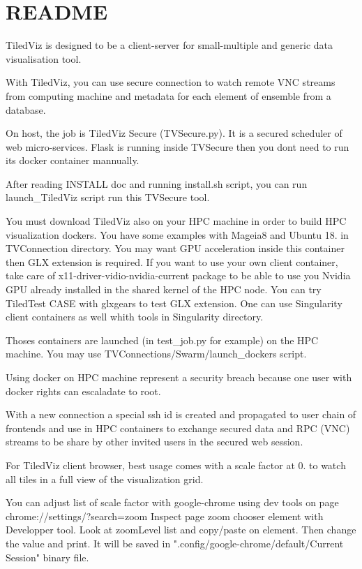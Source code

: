 \chapter{README }
\hypertarget{md_README}{}\label{md_README}
Tiled\+Viz is designed to be a client-\/server for small-\/multiple and generic data visualisation tool.

With Tiled\+Viz, you can use secure connection to watch remote VNC streams from computing machine and metadata for each element of ensemble from a database.

On host, the job is Tiled\+Viz Secure (TVSecure.\+py). It is a secured scheduler of web micro-\/services. Flask is running inside TVSecure then you don\textquotesingle{}t need to run its docker container mannually.

After reading INSTALL doc and running install.\+sh script, you can run launch\+\_\+\+Tiled\+Viz script run this TVSecure tool.

You must download Tiled\+Viz also on your HPC machine in order to build HPC visualization dockers. You have some examples with Mageia8 and Ubuntu 18. in TVConnection directory. You may want GPU acceleration inside this container then GLX extension is required. If you want to use your own client container, take care of x11-\/driver-\/vidio-\/nvidia-\/current package to be able to use you Nvidia GPU already installed in the shared kernel of the HPC node. You can try Tiled\+Test CASE with glxgears to test GLX extension. One can use Singularity client containers as well whith tools in Singularity directory.

Thoses containers are launched (in test\+\_\+job.\+py for example) on the HPC machine. You may use TVConnections/\+\+Swarm/\+launch\+\_\+dockers script.

Using docker on HPC machine represent a security breach because one user with docker rights can escaladate to root.

With a new connection a special ssh id is created and propagated to user chain of frontends and use in HPC containers to exchange secured data and RPC (VNC) streams to be share by other invited users in the secured web session.

For Tiled\+Viz client browser, best usage comes with a scale factor at 0. to watch all tiles in a full view of the visualization grid.

You can adjust list of scale factor with google-\/chrome using dev tools on page chrome:\+/\+/\+settings/\+?search=zoom Inspect page zoom chooser element with Developper tool. Look at zoom\+Level list and copy/\+paste on element. Then change the value and print. It will be saved in "{}.\+config/\+google-\/chrome/\+default/\+\+Current Session"{} binary file.


